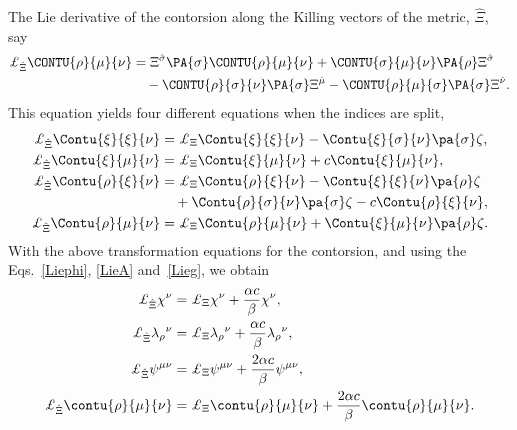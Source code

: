\documentclass[aps,prd,12pt,superscriptaddress,showpacs,showkeys,reprint]{revtex4-1}
\begin{document}
The Lie derivative of the contorsion along the Killing vectors of the metric, $\hat{\Xi}$, say
\begin{equation}
  \begin{split}
    \pounds_{\hat{\Xi}} \CONTU{\rho}{\mu}{\nu} &= \Xi^{\hat{\sigma}} \PA{\sigma} \CONTU{\rho}{\mu}{\nu} + \CONTU{\sigma }{\mu}{\nu} \PA{\rho} \Xi^{\hat{\sigma}} \\
    & \quad - \CONTU{\rho }{\sigma}{\nu} \PA{\sigma} \Xi^{\hat{\mu}} - \CONTU{\rho}{\mu}{\sigma} \PA{\sigma} \Xi^{\hat{\nu}}.
  \end{split}
\end{equation}
This equation yields four different equations when the indices are split,
\begin{align}
  \pounds_{\hat{\Xi}} \Contu{\xi}{\xi}{\nu} &= \pounds_{{\Xi}} \Contu{\xi}{\xi}{\nu}%
  - \Contu{\xi}{\sigma}{\nu} \pa{\sigma} \zeta, \\
  \pounds_{\hat{\Xi}} \Contu{\xi}{\mu}{\nu} &= \pounds_{{\Xi}} \Contu{\xi}{\mu}{\nu} %
  + c \Contu{\xi}{\mu}{\nu}, \\
  \pounds_{\hat{\Xi}} \Contu{\rho}{\xi}{\nu} &= \pounds_{{\Xi}} \Contu{\rho}{\xi}{\nu} - \Contu{\xi}{\xi}{\nu} \pa{\rho} \zeta \\ %
  & \quad + \Contu{\rho}{\sigma}{\nu} \pa{\sigma} \zeta - c \Contu{\rho}{\xi}{\nu} , \notag\\
  \pounds_{\hat{\Xi}} \Contu{\rho}{\mu}{\nu} &= \pounds_{{\Xi}} \Contu{\rho}{\mu}{\nu} %
  + \Contu{\xi}{\mu}{\nu} \pa{\rho} \zeta .%
\end{align}
With the above transformation equations for the contorsion, and using the Eqs.~\eqref{Liephi}, \eqref{LieA} and~\eqref{Lieg}, we obtain
\begin{align}
  \pounds_{\hat{\Xi}} \chi^\nu &= \pounds_\Xi \chi^\nu + \frac{ \alpha c }{ \beta } \chi^\nu, \\
  \pounds_{\hat{\Xi}} \lambda_\rho{}^\nu &= \pounds_\Xi \lambda_\rho{}^\nu + \frac{ \alpha c }{ \beta } \lambda_\rho{}^\nu, \\
  \pounds_{\hat{\Xi}} \psi^{\mu\nu} &= \pounds_\Xi \psi^{\mu\nu} + \frac{ 2 \alpha c }{ \beta } \psi^{\mu\nu}, \\
  \pounds_{\hat{\Xi}} \contu{\rho}{\mu}{\nu} &= \pounds_\Xi \contu{\rho}{\mu}{\nu} + \frac{ 2 \alpha c }{ \beta } \contu{\rho}{\mu}{\nu}.
\end{align}
\end{document}
